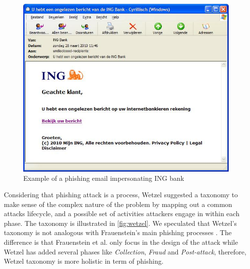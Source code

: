 \begin{figure}
\begin{centering}
\includegraphics[scale=0.4]{gfx/ing-phishing}
\par\end{centering}

\protect\caption{\label{fig:ing}Example of a phishing email impersonating ING bank}
\end{figure}


Considering that phishing attack is a process, Wetzel \citep{wetzel:2005}
suggested a taxonomy to make sense of the complex nature of the problem
by mapping out a common attacks lifecycle, and a possible set of activities
attackers engage in within each phase. The taxonomy is illustrated
in \autoref{fig:wetzel}. We speculated that Wetzel's taxonomy is
not analogous with Frauenstein's main phishing processes \citep{frauenstein:2013}.
The difference is that Frauenstein et al. only focus in the design
of the attack while Wetzel has added several phases like \textit{Collection},
\textit{Fraud} and \textit{Post-attack}, therefore, Wetzel taxonomy
is more holistic in term of phishing.

